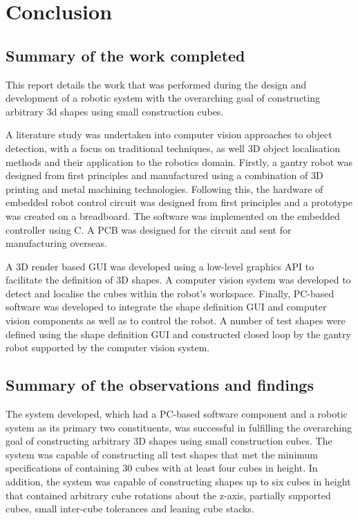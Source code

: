 
\section{Conclusion}

\subsection{Summary of the work completed}

This report details the work that was performed during the design and development of a robotic system with the overarching goal of constructing arbitrary 3d shapes using small construction cubes.

A literature study was undertaken into computer vision approaches to object detection, with a focus on traditional techniques, as well 3D object localisation methods and their application to the robotics domain. Firstly, a gantry robot was designed from first principles and manufactured using a combination of 3D printing and metal machining technologies. Following this, the hardware of embedded robot control circuit was designed from first principles and a prototype was created on a breadboard. The software was implemented on the embedded controller using C. A PCB was designed for the circuit and sent for manufacturing overseas.

A 3D render based GUI was developed using a low-level graphics API to facilitate the definition of 3D shapes. A computer vision system was developed to detect and localise the cubes within the robot's workspace. Finally, PC-based software was developed to integrate the shape definition GUI and computer vision components as well as to control the robot. A number of test shapes were defined using the shape definition GUI and constructed closed loop by the gantry robot supported by the computer vision system.

\subsection{Summary of the observations and findings}

The system developed, which had a PC-based software component and a robotic system as its primary two constituents, was successful in fulfilling the overarching goal of constructing arbitrary 3D shapes using small construction cubes. The system was capable of constructing all test shapes that met the minimum specifications of containing 30 cubes with at least four cubes in height. In addition, the system was capable of constructing shapes up to six cubes in height that contained arbitrary cube rotations about the z-axis, partially supported cubes, small inter-cube tolerances and leaning cube stacks.

